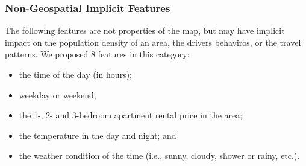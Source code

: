 \subsubsection{Non-Geospatial Implicit Features}

The following features are not properties of the map, but may have implicit impact
on the population density of an area, the drivers behaviros, or the travel patterns.
We proposed 8 features in this category: 
\begin{itemize}
\item the time of the day (in hours); 
\item weekday or weekend; 
\item the 1-, 2- and 3-bedroom apartment rental price in the area; 
\item the temperature in the day and night; and 
\item the weather condition of the time (i.e., sunny, cloudy, shower or rainy, etc.). 
\end{itemize}


